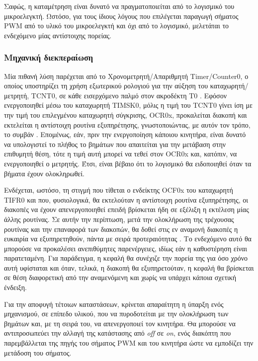 Σαφώς, η καταμέτρηση είναι δυνατό να πραγματοποιείται από το λογισμικό του
μικροελεγκτή. Ωστόσο, για τους ίδιους λόγους που επιλέγεται παραγωγή σήματος PWM
από το υλικό του μικροελεγκτή και όχι από το λογισμικό, μελετάται το ενδεχόμενο
μίας αντίστοιχης πορείας.


\subsubsection{Μηχανική διεκπεραίωση}

Μία πιθανή λύση παρέχεται από το Χρονομετρητή\slash Απαριθμητή
\textenglish{Timer\slash Counter0}, ο οποίος υποστηρίζει τη χρήση εξωτερικού
ρολογιού για την αύξηση του καταχωρητή\slash μετρητή, TCNT0, σε κάθε εισερχόμενο
παλμό στον ακροδέκτη T0 \parencite[109]{atmel13}. Εφόσον ενεργοποιηθεί μέσω του
καταχωρητή TIMSK0, μόλις η τιμή του TCNT0 γίνει ίση με την τιμή του επιλεγμένου
καταχωρητή σύγκρισης, OCR0x, προκαλείται διακοπή και εκτελείται η αντίστοιχη
ρουτίνα εξυπηρέτησης, γνωστοποιώντας, με αυτόν τον τρόπο, το συμβάν
\parencite[110]{atmel13}. Επομένως, εάν, πριν την ενεργοποίηση κάποιου κινητήρα,
είναι δυνατό να υπολογιστεί το πλήθος το βημάτων που απαιτείται για την μετάβαση
στην επιθυμητή θέση, τότε η τιμή αυτή μπορεί να τεθεί στον OCR0x και, κατόπιν,
να ενεργοποιηθεί ο μετρητής. Έτσι, είναι βέβαιο ότι το λογισμικό θα ειδοποιηθεί
όταν τα βήματα έχουν ολοκληρωθεί.

Ενδέχεται, ωστόσο, τη στιγμή που τίθεται ο ενδείκτης OCF0x του καταχωρητή TIFR0
και που, φυσιολογικά, θα εκτελούταν η αντίστοιχη ρουτίνα εξυπηρέτησης, οι
διακοπές να έχουν απενεργοποιηθεί επειδή βρίσκεται ήδη σε εξέλιξη η εκτέλεση
μίας άλλης ρουτίνας. Σε αυτήν την περίπτωση, μετά την ολοκλήρωση της τρέχουσας
ρουτίνας και την επαναφορά των διακοπών, θα δοθεί στις εν αναμονή διακοπές η
ευκαιρία να εξυπηρετηθούν, πάντα με σειρά προτεραιότητας
\parencite[13--14,57]{atmel13}. Το ενδεχόμενο αυτό θα μπορούσε να προκαλέσει
ανεπιθύμητες παρενέργειες, ιδίως εάν η καθυστέρηση είναι παρατεταμένη. Για
παράδειγμα, η κεφαλή θα συνέχιζε την πορεία της για όσο χρόνο αυτή υφίσταται και
όταν, τελικά, η διακοπή θα εξυπηρετούταν, η κεφαλή θα βρίσκεται σε θέση
διαφορετική από την αναμενόμενη και χωρίς να υπάρχει κάποια σχετική ένδειξη.

Για την αποφυγή τέτοιων καταστάσεων, κρίνεται απαραίτητη η ύπαρξη ενός
μηχανισμού, σε επίπεδο υλικού, που να πυροδοτείται με την ολοκλήρωση των βημάτων
και, με τη σειρά του, να απενεργοποιεί τον κινητήρα. Θα μπορούσε να
αντιπροσωπεύει την αλλαγή της κατάστασης από \emph{off} σε \emph{on}, ενός
διακόπτη που παρεμβάλλεται της πηγής του σήματος PWM και του κινητήρα ώστε να
εμποδίζει την μετάδοση του σήματος.

